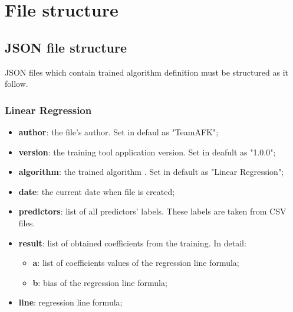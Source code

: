 \section{File structure}
	\subsection{JSON file structure}
JSON files which contain trained algorithm definition must be structured as it follow.	

		\subsubsection{Linear Regression}
		\begin{itemize}
			\item\textbf{author}: the file's author. Set in defaul as "TeamAFK";
			\item\textbf{version}: the training tool application version. Set in deafult as "1.0.0";
			\item\textbf{algorithm}: the trained algorithm . Set in default as "Linear Regression"; 	
			\item\textbf{date}: the current date when file is created;
			\item\textbf{predictors}: list of all predictors' labels. These labels are taken from CSV files.
			\item\textbf{result}: list of obtained coefficients from the training. In detail:
			\begin{itemize}
					\item\textbf{a}: list of coefficients values of the regression line formula;
					\item\textbf{b}: bias of the regression line formula;
				\end{itemize}
			\item\textbf{line}: regression line formula;
					
		\end{itemize}
		
